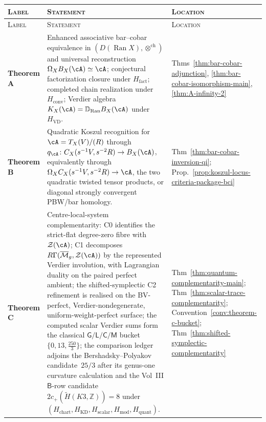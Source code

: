 \medskip

\renewcommand{\arraystretch}{1.3}
\begin{longtable}{@{}p{2.2cm}p{7.7cm}p{3.0cm}@{}}
\textsc{Label} & \textsc{Statement} & \textsc{Location} \\
\hline
\endfirsthead
\textsc{Label} & \textsc{Statement} & \textsc{Location} \\
\hline
\endhead
\textbf{Theorem A} &
 Enhanced associative bar--cobar equivalence in
 $(D(\operatorname{Ran}X),\otimes^{\mathrm{ch}})$ and universal
 reconstruction $\Omega_XB_X(\cA)\simeq\cA$; conjectural
 factorization closure under $H_{\mathrm{fact}}$; completed chain
 realization under $H_{\mathrm{conv}}$; Verdier algebra
 $K_X(\cA)=\mathbb D_{\operatorname{Ran}}B_X(\cA)$ under
 $H_{\mathrm{VD}}$. &
 Thms~\ref{thm:bar-cobar-adjunction},
 \ref{thm:bar-cobar-isomorphism-main},
 \ref{thm:A-infinity-2} \\[4pt]

\textbf{Theorem B} &
 Quadratic Koszul recognition for
 $\cA=T_X(V)/(R)$ through
 $q_\cA\colon C_X(s^{-1}V,s^{-2}R)\to B_X(\cA)$, equivalently through
 $\Omega_XC_X(s^{-1}V,s^{-2}R)\to\cA$, the two quadratic twisted tensor
 products, or diagonal strongly convergent PBW/bar homology. &
 Thm~\ref{thm:bar-cobar-inversion-qi};
 Prop.~\ref{prop:koszul-locus-criteria-package-bci}
 \\[4pt]

\textbf{Theorem C} &
Centre-local-system complementarity: C0 identifies the strict-flat
degree-zero fibre with~$\mathcal Z(\cA)$; C1 decomposes
$R\Gamma(\overline{\mathcal M}_g,\mathcal Z(\cA))$ by the represented
Verdier involution, with Lagrangian duality on the paired perfect
ambient; the shifted-symplectic C2 refinement is realised on the
BV-perfect, Verdier-nondegenerate, uniform-weight-perfect surface; the
computed scalar Verdier sums form the classical
$\mathsf{G}/\mathsf{L}/\mathsf{C}/\mathsf{M}$ bucket
$\{0,13,\frac{250}{3}\}$; the comparison ledger adjoins the
\ClaimStatusOpen{} Bershadsky--Polyakov candidate~$25/3$ after its
genus-one curvature calculation and the
\ClaimStatusConjectured{} Vol~III $\mathsf{B}$-row candidate
$2c_+(\widetilde H(K3,\mathbb Z))=8$ under
$(H_{\mathrm{chart}},H_{\mathrm{KD}},H_{\mathrm{scalar}},
H_{\mathrm{mod}},H_{\mathrm{quant}})$. &
Thm~\ref{thm:quantum-complementarity-main};
Thm~\ref{thm:scalar-trace-complementarity};
Convention~\ref{conv:theorem-c-bucket};
Thm~\ref{thm:shifted-symplectic-complementarity} \\[4pt]


\end{longtable}
